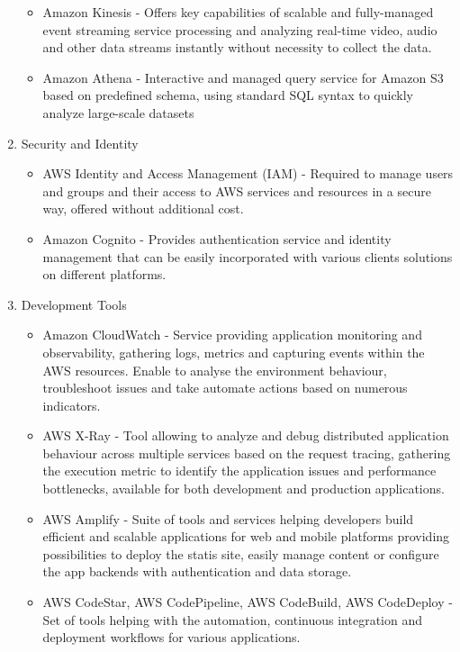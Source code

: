\begin{enumerate}
\begin{itemize}
       \item Amazon Kinesis - Offers key capabilities of scalable and fully-managed event streaming service processing and analyzing real-time video, audio and other data streams instantly without necessity to collect the data.
       \item Amazon Athena - Interactive and managed query service for Amazon S3 based on predefined schema, using standard SQL syntax to quickly analyze large-scale datasets
   \end{itemize}
   \item Security and Identity
   \begin{itemize}
       \item AWS Identity and Access Management (IAM) - Required to manage users and groups and their access to AWS services and resources in a secure way, offered without additional cost.
       \item Amazon Cognito - Provides authentication service and identity management that can be easily incorporated with various clients solutions on different platforms.
   \end{itemize}
   \item Development Tools
   \begin{itemize}
       \item Amazon CloudWatch - Service providing application monitoring and observability, gathering logs, metrics and capturing events within the AWS resources. Enable to analyse the environment behaviour, troubleshoot issues and take automate actions based on numerous indicators.
       \item AWS X-Ray - Tool allowing to analyze and debug distributed application behaviour across multiple services based on the request tracing, gathering the execution metric to identify the application issues and performance bottlenecks, available for both development and production applications.
       \item AWS Amplify - Suite of tools and services helping developers build efficient and scalable applications for web and mobile platforms providing possibilities to deploy the statis site, easily manage content or configure the app backends with authentication and data storage.
       \item AWS CodeStar, AWS CodePipeline, AWS CodeBuild, AWS CodeDeploy - Set of tools helping with the automation, continuous integration and deployment workflows for various applications.
   \end{itemize}
\end{enumerate}

